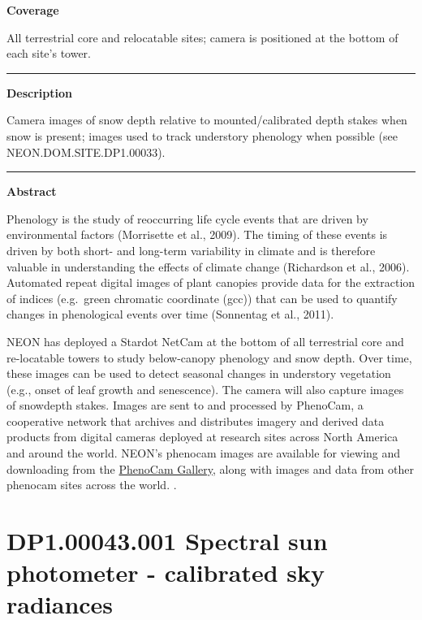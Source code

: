 \documentclass[]{article}
\begin{document}
\textbf{Coverage}

All terrestrial core and relocatable sites; camera is positioned at the
bottom of each site's tower.

\begin{center}\rule{0.5\linewidth}{\linethickness}\end{center}

\textbf{Description}

Camera images of snow depth relative to mounted/calibrated depth stakes
when snow is present; images used to track understory phenology when
possible (see NEON.DOM.SITE.DP1.00033).

\begin{center}\rule{0.5\linewidth}{\linethickness}\end{center}

\textbf{Abstract}

Phenology is the study of reoccurring life cycle events that are driven
by environmental factors (Morrisette et al., 2009). The timing of these
events is driven by both short- and long-term variability in climate and
is therefore valuable in understanding the effects of climate change
(Richardson et al., 2006). Automated repeat digital images of plant
canopies provide data for the extraction of indices (e.g.~green
chromatic coordinate (gcc)) that can be used to quantify changes in
phenological events over time (Sonnentag et al., 2011).

NEON has deployed a Stardot NetCam at the bottom of all terrestrial core
and re-locatable towers to study below-canopy phenology and snow depth.
Over time, these images can be used to detect seasonal changes in
understory vegetation (e.g., onset of leaf growth and senescence). The
camera will also capture images of snowdepth stakes. Images are sent to
and processed by PhenoCam, a cooperative network that archives and
distributes imagery and derived data products from digital cameras
deployed at research sites across North America and around the world.
NEON's phenocam images are available for viewing and downloading from
the \href{https://phenocam.sr.unh.edu}{PhenoCam Gallery}, along with
images and data from other phenocam sites across the world. \newpage
.

\section{DP1.00043.001 Spectral sun photometer - calibrated sky
radiances}\label{dp1.00043.001-spectral-sun-photometer---calibrated-sky-radiances}
\end{document}
